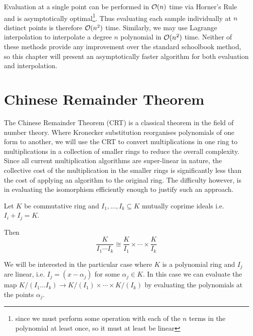 \medskip

Evaluation at a single point can be performed in $\mathcal O(n)$ time via Horner's Rule and is asymptotically optimal\footnote{since we must perform some operation with each of the $n$ terms in the polynomial at least once, so it must at least be linear}. Thus evaluating each sample individually at $n$ distinct points is therefore $\mathcal O(n^2)$ time. Similarly, we may use Lagrange interpolation to interpolate a degree $n$ polynomial in $\mathcal O(n^2)$ time. Neither of these methods provide any improvement over the standard schoolbook method, so this chapter will present an asymptotically faster algorithm for both evaluation and interpolation.

\section{Chinese Remainder Theorem}%
\label{sec:crt}

The Chinese Remainder Theorem (CRT) is a classical theorem in the field of number theory. Where Kronecker substitution reorganises polynomials of one form to another, we will use the CRT to convert multiplications in one ring to multiplications in a collection of smaller rings to reduce the overall complexity. Since all current multiplication algorithms are super-linear in nature, the collective cost of the multiplication in the smaller rings is significantly less than the cost of applying an algorithm to the original ring. The difficulty however, is in evaluating the isomorphism efficiently enough to justify such an approach.

\begin{theorem}\label{thm:crt}
    Let $K$ be commutative ring and $I_1, \ldots, I_k \subseteq K$ mutually coprime ideals i.e. $I_i + I_j = K$.

    Then
    \[
        \frac{K}{I_1\cdots I_k} \cong \frac{K}{I_1} \times \cdots \times \frac{K}{I_k}
    \]
\end{theorem}

\medskip

We will be interested in the particular case where $K$ is a polynomial ring and $I_j$ are linear, i.e. $I_j = (x - \alpha_j)$ for some $\alpha_j \in K$. In this case we can evaluate the map $K/(I_1\ldots I_k) \to K/(I_1) \times \cdots \times K/(I_k)$ by evaluating the polynomials at the points $\alpha_j$.

